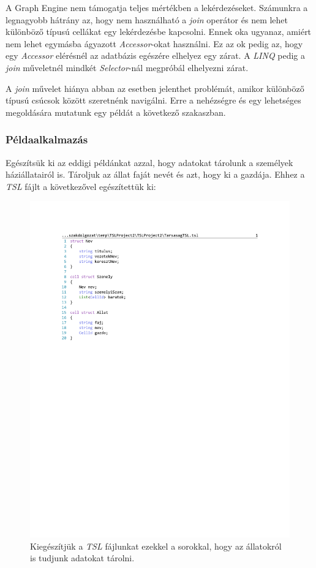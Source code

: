 A Graph Engine nem támogatja teljes mértékben a lekérdezéseket. Számunkra a legnagyobb hátrány az, hogy nem használható a \emph{join} operátor és nem lehet különböző típusú cellákat egy lekérdezésbe kapcsolni. Ennek oka ugyanaz, amiért nem lehet egymásba ágyazott \emph{Accessor}-okat használni. Ez az ok pedig az, hogy egy \emph{Accessor} elérésnél az adatbázis egészére elhelyez egy zárat. A \emph{LINQ} pedig a \emph{join} műveletnél mindkét \emph{Selector}-nál megpróbál elhelyezni zárat.

A \emph{join} művelet hiánya abban az esetben jelenthet problémát, amikor különböző típusú csúcsok között szeretnénk navigálni. Erre a nehézségre és egy lehetséges megoldására mutatunk egy példát a következő szakaszban.

\subsubsection{Példaalkalmazás}

Egészítsük ki az eddigi példánkat azzal, hogy adatokat tárolunk a személyek háziállatairól is. Tároljuk az állat faját nevét és azt, hogy ki a gazdája. Ehhez a \emph{TSL} fájlt a következővel egészítettük ki:

\begin{figure}[H]
	\centering
	\includegraphics[]{figures/TarsasagAllatTSL.pdf}
	\caption{Kiegészítjük a \emph{TSL} fájlunkat ezekkel a sorokkal, hogy az állatokról is tudjunk adatokat tárolni.}
	\label{fig:TarsasagAllat}
\end{figure}

